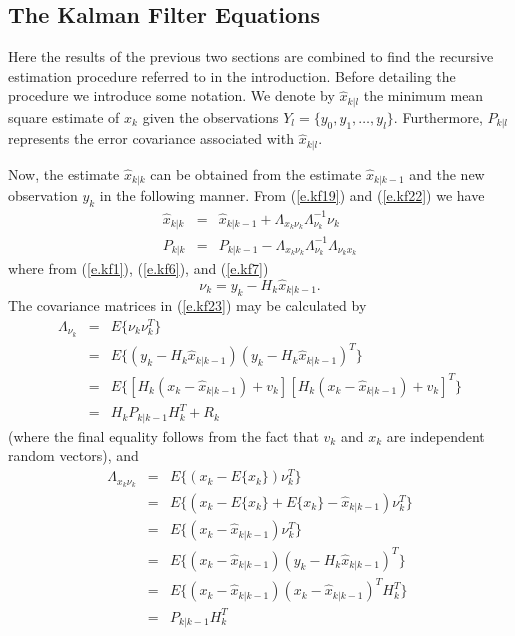 \subsection{The Kalman Filter Equations}

	Here the results of the previous two sections
are combined to find the recursive estimation procedure
referred to in the introduction.  Before detailing the
procedure we introduce some notation.  We denote by
$\hat{x}_{k|l}$ the minimum mean square estimate of $x_k$
given the observations $Y_l=\{y_0,y_1,\ldots,y_l\}$.  Furthermore,
$P_{k|l}$ represents the error covariance associated with 
$\hat{x}_{k|l}$.

	Now, the estimate $\hat{x}_{k|k}$ can be obtained
from the estimate $\hat{x}_{k|k-1}$ and the new observation $y_k$
in the following manner.  From (\ref{e.kf19}) and (\ref{e.kf22})
we have
%
\begin{eqnarray}
\hat{x}_{k|k}&=&\hat{x}_{k|k-1}+\Lambda_{x_k\nu_k}\Lambda_{\nu_k}^{-1}\nu_k\nonumber\\
P_{k|k}&=&P_{k|k-1}-\Lambda_{x_k\nu_k}\Lambda_{\nu_k}^{-1}\Lambda_{\nu_k x_k}
\label{e.kf23}
\end{eqnarray}
%
where from (\ref{e.kf1}), (\ref{e.kf6}), and (\ref{e.kf7})
%
\begin{equation}
\nu_k=y_k-H_k\hat{x}_{k|k-1}.
\label{e.kf24}
\end{equation}
%
The covariance
matrices in (\ref{e.kf23}) may be calculated by
%
\begin{eqnarray}
\Lambda_{\nu_k}&=&E\{\nu_k\nu_k^T\}\nonumber\\
               &=&E\{(y_k-H_k\hat{x}_{k|k-1})(y_k-H_k\hat{x}_{k|k-1})^T\}\nonumber\\
               &=&E\{[H_k(x_k-\hat{x}_{k|k-1})+v_k][H_k(x_k-\hat{x}_{k|k-1})+v_k]^T\}\nonumber\\
               &=&H_kP_{k|k-1}H_k^T+R_k
\label{e.kf25}
\end{eqnarray}
%
(where the final equality follows from the fact that $v_k$ and
$x_k$ are independent random vectors), and
%
\begin{eqnarray}
\Lambda_{x_k\nu_k}&=&E\{(x_k-E\{x_k\})\nu_k^T\}\nonumber\\
               &=&E\{(x_k-E\{x_k\}+E\{x_k\}-\hat{x}_{k|k-1})\nu_k^T\}\nonumber\\
               &=&E\{(x_k-\hat{x}_{k|k-1})\nu_k^T\}\nonumber\\
               &=&E\{(x_k-\hat{x}_{k|k-1})(y_k-H_k\hat{x}_{k|k-1})^T\}\nonumber\\
               &=&E\{(x_k-\hat{x}_{k|k-1})(x_k-\hat{x}_{k|k-1})^TH_k^T\}\nonumber\\
               &=&P_{k|k-1}H_k^T
\label{e.kf26}
\end{eqnarray}
